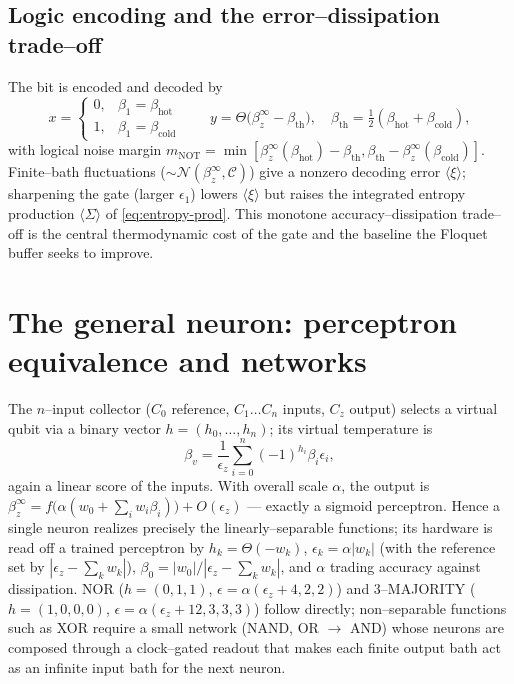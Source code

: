 \documentclass[11pt,a4paper]{article}
\theoremstyle{plain}
\theoremstyle{definition}
\theoremstyle{remark}
\newcommand{\calC}{\mathcal{C}}
\begin{document}
\subsection{Logic encoding and the error--dissipation trade--off}
\label{sec:logic}
The bit is encoded and decoded by
\begin{equation}
x=\begin{cases}0,&\beta_1=\beta_{\mathrm{hot}}\\1,&\beta_1=\beta_{\mathrm{cold}}\end{cases}
\qquad
y=\Theta\!\big(\beta_z^\infty-\beta_{\mathrm{th}}\big),\quad
\beta_{\mathrm{th}}=\tfrac12(\beta_{\mathrm{hot}}+\beta_{\mathrm{cold}}),
\label{eq:encoding}
\end{equation}
with logical noise margin
$m_{\mathrm{NOT}}=\min[\beta_z^\infty(\beta_{\mathrm{hot}})-\beta_{\mathrm{th}},
\beta_{\mathrm{th}}-\beta_z^\infty(\beta_{\mathrm{cold}})]$. Finite--bath
fluctuations ($\sim\mathcal N(\beta_z^\infty,\calC)$) give a nonzero
decoding error $\langle\xi\rangle$; sharpening the gate (larger
$\epsilon_1$) lowers $\langle\xi\rangle$ but raises the integrated entropy
production $\langle\Sigma\rangle$ of \eqref{eq:entropy-prod}. This
monotone accuracy--dissipation trade--off is the central thermodynamic
cost of the gate and the baseline the Floquet buffer seeks to improve.

\section{The general neuron: perceptron equivalence and networks}
\label{sec:general}
The $n$--input collector ($C_0$ reference, $C_1\ldots C_n$ inputs, $C_z$
output) selects a virtual qubit via a binary vector
$h=(h_0,\ldots,h_n)$; its virtual temperature is
\begin{equation}
\beta_v=\frac{1}{\epsilon_z}\sum_{i=0}^{n}(-1)^{h_i}\beta_i\epsilon_i,
\label{eq:betav-gen}
\end{equation}
again a linear score of the inputs. With overall scale $\alpha$, the
output is $\beta_z^\infty=f\big(\alpha(w_0+\sum_i w_i\beta_i)\big)
+O(\epsilon_z)$ --- exactly a sigmoid perceptron. Hence a single neuron
realizes precisely the linearly--separable functions; its hardware is read
off a trained perceptron by
$h_k=\Theta(-w_k)$, $\epsilon_k=\alpha|w_k|$ (with the reference set by
$|\epsilon_z-\sum_k w_k|$), $\beta_0=|w_0|/|\epsilon_z-\sum_k w_k|$, and
$\alpha$ trading accuracy against dissipation. NOR ($h=(0,1,1)$,
$\epsilon=\alpha(\epsilon_z+4,2,2)$) and 3--MAJORITY ($h=(1,0,0,0)$,
$\epsilon=\alpha(\epsilon_z+12,3,3,3)$) follow directly; non--separable
functions such as XOR require a small network (NAND, OR $\to$ AND) whose
neurons are composed through a clock--gated readout that makes each finite
output bath act as an infinite input bath for the next neuron.
\end{document}
